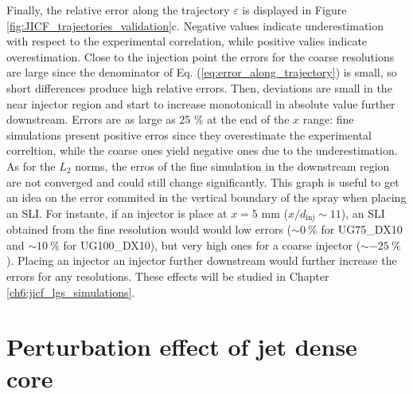 Finally, the relative error along the trajectory $\varepsilon$ is displayed in Figure \ref{fig:JICF_trajectories_validation}c. Negative values indicate underestimation with respect to the experimental correlation, while positive valies indicate overestimation. Close to the injection point the errors for the coarse resolutions are large since the denominator of Eq. (\ref{eq:error_along_trajectory}) is small, so short differences produce high relative errors. Then, deviations are small in the near injector region and start to increase monotonicall in absolute value further downstream. Errors are as large as 25 $\%$ at the end of the $x$ range: fine simulations present positive erros since they overestimate the experimental correltion, while the coarse ones yield negative ones due to the underestimation. As for the $L_2$ norms, the erros of the fine simulation in the downstream region are not converged and could still change significantly. This graph is useful to get an idea on the error commited in the vertical boundary of the spray when placing an SLI. For instante, if an injector is place at $x = 5$ mm ($x/d_\mathrm{inj} \sim 11$), an SLI obtained from the fine resolution would would low errors ($\sim 0~\%$ for UG75\_DX10 and $\sim 10~\%$ for UG100\_DX10), but very high ones for a coarse injector ($\sim - 25~\%$). Placing an injector an injector further downstream would further increase the errors for  any resolutions. These effects will be studied in Chapter \ref{ch6:jicf_lgs_simulations}.

%

\clearpage

\section{Perturbation effect of jet dense core}
\label{subsec:ch5_dense_core_in_ACLS_simus}



